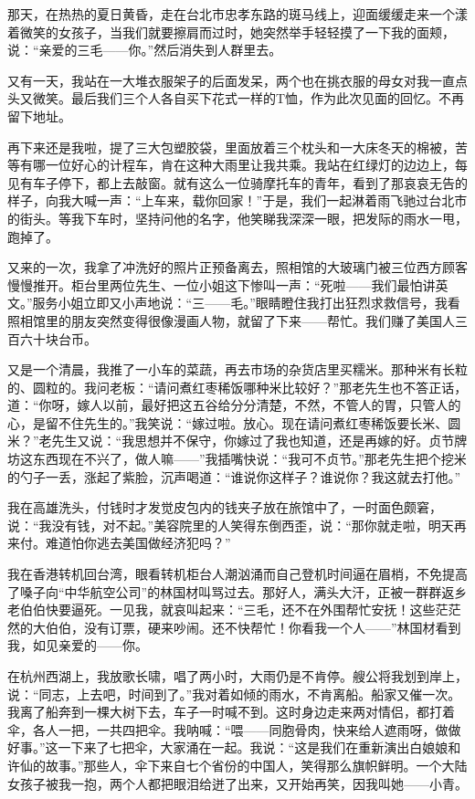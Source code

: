 \par 那天，在热热的夏日黄昏，走在台北市忠孝东路的斑马线上，迎面缓缓走来一个漾着微笑的女孩子，当我们就要擦肩而过时，她突然举手轻轻摸了一下我的面颊，说：“亲爱的三毛——你。”然后消失到人群里去。
\par 又有一天，我站在一大堆衣服架子的后面发呆，两个也在挑衣服的母女对我一直点头又微笑。最后我们三个人各自买下花式一样的T恤，作为此次见面的回忆。不再留下地址。
\par 再下来还是我啦，提了三大包塑胶袋，里面放着三个枕头和一大床冬天的棉被，苦等有哪一位好心的计程车，肯在这种大雨里让我共乘。我站在红绿灯的边边上，每见有车子停下，都上去敲窗。就有这么一位骑摩托车的青年，看到了那哀哀无告的样子，向我大喊一声：“上车来，载你回家！”于是，我们一起淋着雨飞驰过台北市的街头。等我下车时，坚持问他的名字，他笑睇我深深一眼，把发际的雨水一甩，跑掉了。
\par 又来的一次，我拿了冲洗好的照片正预备离去，照相馆的大玻璃门被三位西方顾客慢慢推开。柜台里两位先生、一位小姐这下惨叫一声：“死啦——我们最怕讲英文。”服务小姐立即又小声地说：“三——毛。”眼睛瞪住我打出狂烈求救信号，我看照相馆里的朋友突然变得很像漫画人物，就留了下来——帮忙。我们赚了美国人三百六十块台币。
\par 又是一个清晨，我推了一小车的菜蔬，再去市场的杂货店里买糯米。那种米有长粒的、圆粒的。我问老板：“请问煮红枣稀饭哪种米比较好？”那老先生也不答正话，道：“你呀，嫁人以前，最好把这五谷给分分清楚，不然，不管人的胃，只管人的心，是留不住先生的。”我笑说：“嫁过啦。放心。现在请问煮红枣稀饭要长米、圆米？”老先生又说：“我思想并不保守，你嫁过了我也知道，还是再嫁的好。贞节牌坊这东西现在不兴了，做人嘛——”我插嘴快说：“我可不贞节。”那老先生把个挖米的勺子一丢，涨起了紫脸，沉声喝道：“谁说你这样子？谁说你？我这就去打他。”
\par 我在高雄洗头，付钱时才发觉皮包内的钱夹子放在旅馆中了，一时面色颇窘，说：“我没有钱，对不起。”美容院里的人笑得东倒西歪，说：“那你就走啦，明天再来付。难道怕你逃去美国做经济犯吗？”
\par 我在香港转机回台湾，眼看转机柜台人潮汹涌而自己登机时间逼在眉梢，不免提高了嗓子向“中华航空公司”的林国材叫骂过去。那好人，满头大汗，正被一群群返乡老伯伯快要逼死。一见我，就哀叫起来：“三毛，还不在外围帮忙安抚！这些茫茫然的大伯伯，没有订票，硬来吵闹。还不快帮忙！你看我一个人——”林国材看到我，如见亲爱的——你。
\par 在杭州西湖上，我放歌长啸，唱了两小时，大雨仍是不肯停。艘公将我划到岸上，说：“同志，上去吧，时间到了。”我对着如倾的雨水，不肯离船。船家又催一次。我离了船奔到一棵大树下去，车子一时喊不到。这时身边走来两对情侣，都打着伞，各人一把，一共四把伞。我呐喊：“喂——同胞骨肉，快来给人遮雨呀，做做好事。”这一下来了七把伞，大家涌在一起。我说：“这是我们在重新演出白娘娘和许仙的故事。”那些人，伞下来自七个省份的中国人，笑得那么旗帜鲜明。一个大陆女孩子被我一抱，两个人都把眼泪给迸了出来，又开始再笑，因我叫她——小青。
